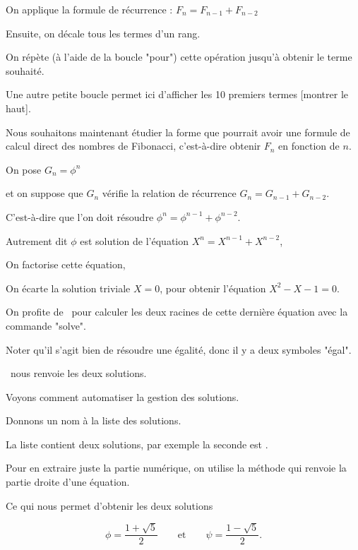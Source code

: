 On applique la formule de récurrence :
$F_{n} = F_{n-1} + F_{n-2}$

Ensuite, on décale tous les termes d'un rang.

On répète (à l'aide de la boucle "pour") cette opération jusqu'à obtenir le terme souhaité.

\change
Une autre petite boucle permet ici d'afficher les 10 premiers termes [montrer le haut].


\diapo

Nous souhaitons maintenant étudier la forme que pourrait avoir une formule 
de calcul direct des nombres de Fibonacci, c'est-à-dire obtenir $F_n$ en fonction de $n$.

On pose $G_n = \phi^n$ 

et on suppose que $G_n$ vérifie la relation de récurrence
$G_{n} = G_{n-1}+G_{n-2}$.

\change
C'est-à-dire que l'on doit résoudre $\phi^n = \phi^{n-1} + \phi^{n-2}$.

\change
Autrement dit $\phi$ est solution de l'équation
 $X^n = X^{n-1} + X^{n-2}$,
 
\change
On factorise cette équation,

\change
On écarte la solution triviale $X=0$, pour obtenir l'équation 
  $X^2-X-1 = 0$.  
  
\change
On profite de \Sage\ pour calculer les deux racines de 
cette dernière équation avec la commande "solve".

Noter qu'il s'agit bien de résoudre une égalité,
donc il y a deux symboles "égal".

\change
\Sage\ nous renvoie les deux solutions.



\diapo

Voyons comment automatiser la gestion des solutions.

\change
Donnons un nom à la liste des solutions.

\change
La liste contient deux solutions, par exemple la seconde est
.

\change
Pour en extraire juste la partie numérique, on utilise la méthode
 qui renvoie la partie droite d'une équation.

\change
Ce qui nous permet d'obtenir les deux solutions

$$\phi = \frac{1+\sqrt5}{2} \qquad \mbox{et} \qquad \psi  = \frac{1-\sqrt5}{2}.$$
  
